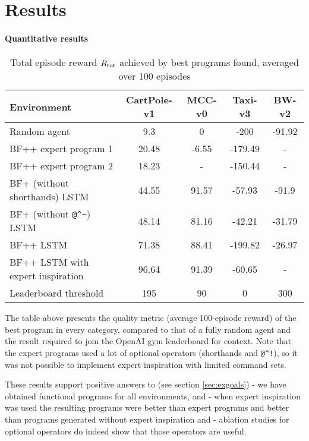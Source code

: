 \newpage
\section{Results}

\paragraph{Quantitative results}

\begin{table}[H]
  \caption{Total episode reward $R_\text{tot}$ achieved by best programs found, averaged over 100 episodes}
  \label{tab:quality}
  \centering
  \begin{tabular}{lcccc}
    Environment     & CartPole-v1     & MCC-v0 & Taxi-v3 & BW-v2 \\
    \midrule
    Random agent & 9.3 & 0 & -200 & -91.92  \\
    \midrule
    BF++ expert program 1 & 20.48 & -6.55 & -179.49 & - \\
    BF++ expert program 2 & 18.23 & - & -150.44 & - \\
    BF+ (without shorthands) LSTM & 44.55 & 91.57 & -57.93 & -91.9 \\
    BF+ (without \verb|@^~|) LSTM & 48.14 & 81.16 & -42.21 & -31.79 \\
    BF++ LSTM     & 71.38 & 88.41 & -199.82 & -26.97 \\
    BF++ LSTM with expert inspiration  & 96.64 & 91.39 & -60.65 & - \\
    \midrule
    Leaderboard threshold & 195 & 90 & 0 & 300 \\
    \bottomrule
  \end{tabular}
\end{table}

The table above presents the quality metric (average 100-episode reward) of the best program in every category, compared to that of a fully random agent and the result required to join the OpenAI gym leaderboard for context.
Note that the expert programs used a lot of optional operators (shorthands and \verb|@^!|), so it was not possible to implement expert inspiration with limited command sets.

These results support positive answers to (see section \ref{sec:exgoals}) \rqbfpp - we have obtained functional programs for all environments, and \rqbfppexpert - when expert inspiration was used the resulting programs were better than expert programs and better than programs generated without expert inspiration and \rqbfppablation - ablation studies for optional operators do indeed show that those operators are useful.

